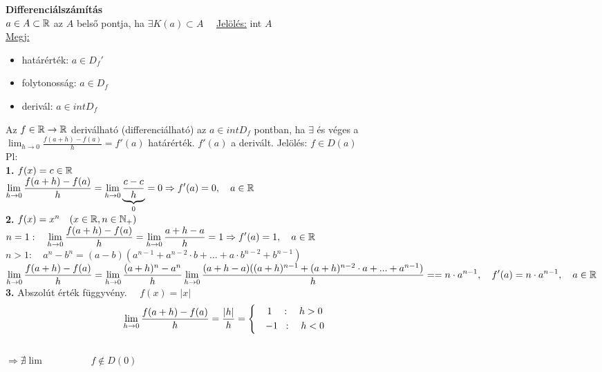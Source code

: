\documentclass[a4paper,11pt]{article}
\begin{document}
\textbf{{\Large Differenciálszámítás}}\\[0.1cm]
 $a\in A\subset\mathbb{R}$ az $A$ belső pontja, ha $\exists K(a)\subset A\quad$
\underline{Jelölés:} int $A$\\[0.1cm]\hspace*{0.3cm} \underline{Megj:}
\begin{itemize}
	\item határérték: $a\in D_f'$
	\item folytonosság: $a\in D_f$
	\item derivál: $a\in int D_f$
\end{itemize}
 Az $f\in\mathbb{R}\to\mathbb{R}$ deriválható (differenciálható) az $a\in int D_f$ pontban, ha
$\exists$ és véges a\\[0.1cm]$\displaystyle\lim_{h\to0}\frac{f(a+h)-f(a)}{h}=f'(a)$
határérték.\hspace{1.5cm} $f'(a)$ a derivált.\hspace{1cm} Jelölés: $f\in D(a)$
\\[0.1cm]Pl:\\[0.1cm] \textbf{1.} $f(x)=c\in\mathbb{R}$\\[0.1cm]
$\displaystyle\lim_{h\to0}\frac{f(a+h)-f(a)}{h}=\displaystyle\lim_{h\to0}
\underbrace{\frac{c-c}{h}}_{0}=0\Rightarrow f'(a)=0,\quad a\in\mathbb{R}$
\\[0.1cm]\textbf{2.} $f(x)=x^n\quad(x\in\mathbb{R},n\in\mathbb{N}_+)$\\[0.1cm]$n=1:
\quad\displaystyle\lim_{h\to0} \frac{f(a+h)-f(a)}{h}=\displaystyle\lim_{h\to0}
\frac{a+h-a}{h}=1\Rightarrow f'(a)=1,\quad a\in\mathbb{R}$\\[0.1cm]$n>1:\quad a^n-b^n=(a-b)
(a^{n-1}+a^{n-2}\cdot b+...+a\cdot b^{n-2}+b^{n-1})$
\\[0.1cm]$\displaystyle\lim_{h\to0}\frac{f(a+h)-f(a)}{h}=\displaystyle\lim_{h\to0}\frac{(a+h)^n-a^n}{h}
\displaystyle\lim_{h\to0}\frac{(a+h-a)((a+h)^{n-1}+(a+h)^{n-2}\cdot a+...+a^{n-1})}{h}=\\[0.1cm]=n\cdot
a^{n-1},\quad f'(a)=n\cdot a^{n-1},\quad a\in\mathbb{R}$\\[0.3cm]\textbf{3.} Abszolút érték
függyvény. $\quad f(x)=|x|$\\[0.3cm]
\[\displaystyle \displaystyle\lim_{h\to0}\frac{f(a+h)-f(a)}{h}=\frac{|h|}{h} = 
\left\{
\begin{gathered}
\quad 1\quad: \quad h>0\hspace{5.7cm} \\
\quad -1\hspace{0.2cm}:\quad h<0\hspace{5.7cm}
\end{gathered}\right. \]\\[0.2cm]
$\Rightarrow\nexists\lim\hspace{2cm}f\notin D(0)$
\end{document}
